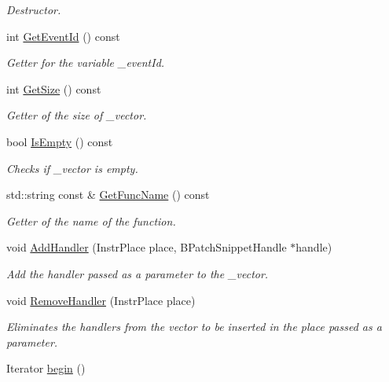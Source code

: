 \begin{DoxyCompactItemize}
\begin{DoxyCompactList}\small\item\em Destructor. \end{DoxyCompactList}\item 
int \hyperlink{class_instr_group_aa17d3fbb57017c6825fef8ea4a28deeb}{Get\-Event\-Id} () const 
\begin{DoxyCompactList}\small\item\em Getter for the variable \-\_\-event\-Id. \end{DoxyCompactList}\item 
int \hyperlink{class_instr_group_a86f2165483dfa146d662eb7d35f15e23}{Get\-Size} () const 
\begin{DoxyCompactList}\small\item\em Getter of the size of \-\_\-vector. \end{DoxyCompactList}\item 
bool \hyperlink{class_instr_group_ae58c61dd4ded42212e94e24dcc09133c}{Is\-Empty} () const 
\begin{DoxyCompactList}\small\item\em Checks if \-\_\-vector is empty. \end{DoxyCompactList}\item 
std\-::string const \& \hyperlink{class_instr_group_af563f5149b24343aed32dcc241d51861}{Get\-Func\-Name} () const 
\begin{DoxyCompactList}\small\item\em Getter of the name of the function. \end{DoxyCompactList}\item 
void \hyperlink{class_instr_group_addcd3f41da597eb9b1a8bab88d906c6c}{Add\-Handler} (Instr\-Place place, B\-Patch\-Snippet\-Handle $\ast$handle)
\begin{DoxyCompactList}\small\item\em Add the handler passed as a parameter to the \-\_\-vector. \end{DoxyCompactList}\item 
void \hyperlink{class_instr_group_aac2f0d8e6ae1d432634096016120f8dd}{Remove\-Handler} (Instr\-Place place)
\begin{DoxyCompactList}\small\item\em Eliminates the handlers from the vector to be inserted in the place passed as a parameter. \end{DoxyCompactList}\item 
Iterator \hyperlink{class_instr_group_a7397b4be484236b0e8a655a2a13abdc1}{begin} ()

\end{DoxyCompactItemize}
